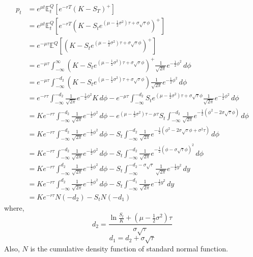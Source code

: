 \begin{equation*}
\begin{split}
p_{t} 
&= e^{\mu t}\mathbb{E}_{t}^{Q}[e^{-rT}(K - S_{T})^{+}]\\
&= e^{\mu t}\mathbb{E}_{t}^{Q}[e^{-rT}(K - S_{t}e^{(\mu - \frac{1}{2}\sigma^{2})\tau + \sigma\sqrt{\tau}\phi})^{+}]\\
&= e^{-\mu \tau}\mathbb{E}^{Q}[(K - S_{t}e^{(\mu - \frac{1}{2}\sigma^{2})\tau + \sigma\sqrt{\tau}\phi})^{+}]\\
&= e^{-\mu \tau}\int_{-\infty}^{\infty} (K - S_{t}e^{(\mu - \frac{1}{2}\sigma^{2})\tau + \sigma\sqrt{\tau}\phi})^{+}\frac{1}{\sqrt{2\pi}}e^{-\frac{1}{2}\phi^{2}}  \, d\phi \\
&= e^{-\mu \tau}\int_{-\infty}^{-d_{2}} (K - S_{t}e^{(\mu - \frac{1}{2}\sigma^{2})\tau + \sigma\sqrt{\tau}\phi})\frac{1}{\sqrt{2\pi}}e^{-\frac{1}{2}\phi^{2}}  \, d\phi \\
&= e^{-r\tau}\int_{-\infty}^{-d_{2}} \frac{1}{\sqrt{2\pi}}e^{-\frac{1}{2}\phi^{2}}K\, d\phi -e^{-\mu \tau}\int_{-\infty}^{-d_{2}} S_{t}e^{(\mu - \frac{1}{2}\sigma^{2})\tau + \sigma\sqrt{\tau}\phi}\frac{1}{\sqrt{2\pi}}e^{-\frac{1}{2}\phi^{2}}  \, d\phi\\
&= Ke^{-r\tau}\int_{-\infty}^{-d_{2}} \frac{1}{\sqrt{2\pi}}e^{-\frac{1}{2}\phi^{2}}\, d\phi - e^{(\mu - \frac{1}{2}\sigma^{2})\tau-\mu \tau}S_{t}\int_{-\infty}^{-d_{2}} \frac{1}{\sqrt{2\pi}}e^{-\frac{1}{2}(\phi^{2}-2\sigma\sqrt{\tau}\phi)}  \, d\phi\\
&= Ke^{-r\tau}\int_{-\infty}^{-d_{2}} \frac{1}{\sqrt{2\pi}}e^{-\frac{1}{2}\phi^{2}}\, d\phi - S_{t}\int_{-\infty}^{-d_{2}} \frac{1}{\sqrt{2\pi}}e^{-\frac{1}{2}(\phi^{2}-2\sigma\sqrt{\tau}\phi+\sigma^{2}\tau)}  \, d\phi\\
&= Ke^{-r\tau}\int_{-\infty}^{-d_{2}} \frac{1}{\sqrt{2\pi}}e^{-\frac{1}{2}\phi^{2}}\, d\phi - S_{t}\int_{-\infty}^{-d_{2}} \frac{1}{\sqrt{2\pi}}e^{-\frac{1}{2}(\phi-\sigma\sqrt{\tau}\phi)^{2}}  \, d\phi\\
&= Ke^{-r\tau}\int_{-\infty}^{d_{2}} \frac{1}{\sqrt{2\pi}}e^{-\frac{1}{2}\phi^{2}}\, d\phi - S_{t}\int_{-\infty}^{-d_{2}-\sigma\sqrt{\tau}} \frac{1}{\sqrt{2\pi}}e^{-\frac{1}{2}y^{2}}  \, dy\\
&= Ke^{-r\tau}\int_{-\infty}^{d_{2}} \frac{1}{\sqrt{2\pi}}e^{-\frac{1}{2}\phi^{2}}\, d\phi - S_{t}\int_{-\infty}^{-d_{1}} \frac{1}{\sqrt{2\pi}}e^{-\frac{1}{2}y^{2}}  \, dy \\
&= Ke^{-r\tau} N(-d_{2}) - S_{t} N(-d_{1})
\end{split}
\end{equation*}
where,
$$d_{2} = \frac{\ln{\frac{S_{t}}{K}} + (\mu - \frac{1}{2}\sigma^{2})\tau}{\sigma\sqrt{\tau}}$$
$$d_{1} = d_{2} + \sigma\sqrt{\tau}$$
Also, $N$ is the cumulative density function of standard normal function.
\newpage


